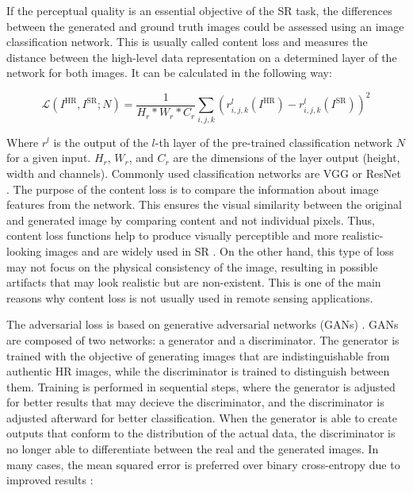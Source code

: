         If the perceptual quality is an essential objective of the SR task, the differences between the generated and ground truth images could be assessed using an image classification network. This is usually called content loss and measures the distance between the high-level data representation on a determined layer of the network for both images. It can be calculated in the following way:

        \begin{equation}
            \mathcal{L}(I^{\text{HR}}, I^{\text{SR}}; N) = \frac{1}{H_r*W_r*C_r}\sum_{i,j,k}(r^{l}_{i,j,k}(I^{\text{HR}}) - r^{l}_{i,j,k}(I^{\text{SR}}))^2
        \end{equation}

        Where $r^{l}$ is the output of the $l$-th layer of the pre-trained classification network $N$ for a given input. $H_r$, $W_r$, and $C_r$ are the dimensions of the layer output (height, width and channels). 
        Commonly used classification networks are VGG \cite{simonyan2015deep} or ResNet \cite{he2015deep}.
        The purpose of the content loss is to compare the information about image features from the network. This ensures the visual similarity between the original and generated image by comparing content and not individual pixels. Thus, content loss functions help to produce visually perceptible and more realistic-looking images and are widely used in SR \cite{ledig2017photorealistic,wang2018recovering}. On the other hand, this type of loss may not focus on the physical consistency of the image, resulting in possible artifacts that may look realistic but are non-existent. This is one of the main reasons why content loss is not usually used in remote sensing applications.

        The adversarial loss is based on generative adversarial networks (GANs) \cite{goodfellow2014generative}. GANs are composed of two networks: a generator and a discriminator. The generator is trained with the objective of generating images that are indistinguishable from authentic HR images, while the discriminator is trained to distinguish between them. 
        Training is performed in sequential steps, where the generator is adjusted for better results that may decieve the discriminator, and the discriminator is adjusted afterward for better classification.
        When the generator is able to create outputs that conform to the distribution of the actual data, the discriminator is no longer able to differentiate between the real and the generated images. In many cases, the mean squared error is preferred over binary cross-entropy due to improved results \cite{mao2017squares}: 

